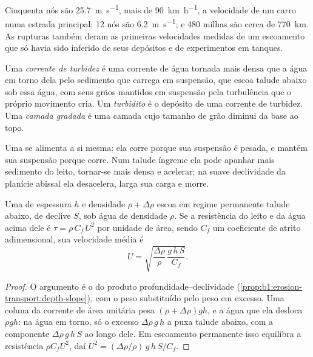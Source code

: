Cinquenta nós são \qty{25.7}{m.s^{-1}}, mais de \qty{90}{km.h^{-1}}, a velocidade de um carro numa estrada principal; 12 nós são \qty{6.2}{m.s^{-1}}; e 480 milhas são cerca de \qty{770}{km}. As rupturas também deram as primeiras velocidades medidas de um escoamento que só havia sido inferido de seus depósitos e de experimentos em tanques.

\begin{definition}\label{def:b1:clastic-sediments:turbidite}
Uma \emph{corrente de turbidez} é uma corrente de água tornada mais densa que a água em torno dela pelo sedimento que carrega em suspensão, que escoa talude abaixo sob essa água, com seus grãos mantidos em suspensão pela turbulência que o próprio movimento cria. Um \emph{turbidito} é o depósito de uma corrente de turbidez. Uma \emph{camada gradada} é uma camada cujo tamanho de grão diminui da base ao topo.
\end{definition}

Uma  se alimenta a si mesma: ela corre porque sua suspensão é pesada, e mantém sua suspensão porque corre. Num talude íngreme ela pode apanhar mais sedimento do leito, tornar-se mais densa e acelerar; na suave declividade da planície abissal ela desacelera, larga sua carga e morre.

\begin{proposition}\label{prop:b1:clastic-sediments:turbidity}
Uma  de espessura $h$ e densidade $\rho + \Delta\rho$ escoa em regime permanente talude abaixo, de declive $S$, sob água de densidade $\rho$. Se a resistência do leito e da água acima dele é $\tau = \rho\,C_f\,U^2$ por unidade de área, sendo $C_f$ um coeficiente de atrito adimensional, sua velocidade média é
\[
  U = \sqrt{\frac{\Delta\rho}{\rho}\,\frac{g\,h\,S}{C_f}} .
\]
\end{proposition}

\begin{proof}
O argumento é o do produto profundidade--declividade (\cref{prop:b1:erosion-transport:depth-slope}), com o peso substituído pelo peso em excesso. Uma coluna da corrente de área unitária pesa $(\rho +
\Delta\rho) g h$, e a água que ela desloca $\rho g h$: na água em torno, só o excesso $\Delta\rho\,g\,h$ a puxa talude abaixo, com a componente $\Delta\rho\,g\,h\,S$ ao longo dele. Em escoamento permanente isso equilibra a resistência $\rho C_f U^2$, daí $U^2 = (\Delta\rho/\rho)\,g\,h\,S/C_f$.
\end{proof}

